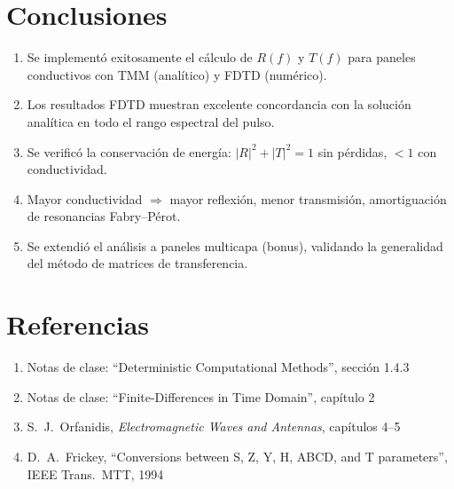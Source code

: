 \documentclass[11pt,a4paper]{article}
\begin{document}
\section{Conclusiones}

\begin{enumerate}
  \item Se implement\'o exitosamente el c\'alculo de $R(f)$ y $T(f)$ para paneles conductivos con TMM (anal\'itico) y FDTD (num\'erico).
  \item Los resultados FDTD muestran excelente concordancia con la soluci\'on anal\'itica en todo el rango espectral del pulso.
  \item Se verific\'o la conservaci\'on de energ\'ia: $|R|^2+|T|^2=1$ sin p\'erdidas, $<1$ con conductividad.
  \item Mayor conductividad $\Rightarrow$ mayor reflexi\'on, menor transmisi\'on, amortiguaci\'on de resonancias Fabry--P\'erot.
  \item Se extendi\'o el an\'alisis a paneles multicapa (bonus), validando la generalidad del m\'etodo de matrices de transferencia.
\end{enumerate}

\section{Referencias}

\begin{enumerate}
  \item Notas de clase: ``Deterministic Computational Methods'', secci\'on 1.4.3
  \item Notas de clase: ``Finite-Differences in Time Domain'', cap\'itulo 2
  \item S.~J.~Orfanidis, \textit{Electromagnetic Waves and Antennas}, cap\'itulos 4--5
  \item D.~A.~Frickey, ``Conversions between S, Z, Y, H, ABCD, and T parameters'', IEEE Trans.~MTT, 1994
\end{enumerate}
\end{document}
